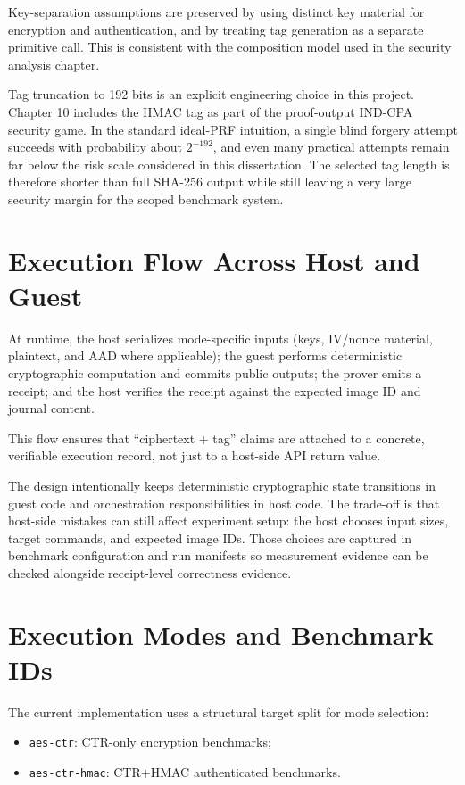 Key-separation assumptions are preserved by using distinct key material for
encryption and authentication, and by treating tag generation as a separate
primitive call. This is consistent with the composition model used in the
security analysis chapter.

Tag truncation to 192 bits is an explicit engineering choice in this project.
Chapter 10 includes the HMAC tag as part of the proof-output IND-CPA security
game.
In the standard ideal-PRF intuition, a single blind forgery attempt succeeds with
probability about \(2^{-192}\), and even many practical attempts remain far below
the risk scale considered in this dissertation. The selected tag length is
therefore shorter than full SHA-256 output while still leaving a very large
security margin for the scoped benchmark system.

\section{Execution Flow Across Host and Guest}

At runtime, the host serializes mode-specific inputs (keys, IV/nonce material,
plaintext, and AAD where applicable); the guest performs deterministic
cryptographic computation and commits
public outputs; the prover emits a receipt; and the host verifies the receipt
against the expected image ID and journal content.

This flow ensures that ``ciphertext + tag'' claims are attached to a concrete,
verifiable execution record, not just to a host-side API return value.

The design intentionally keeps deterministic cryptographic state transitions in
guest code and orchestration responsibilities in host code. The trade-off is that
host-side mistakes can still affect experiment setup: the host chooses input
sizes, target commands, and expected image IDs. Those choices are captured in
benchmark configuration and run manifests so measurement evidence can be checked
alongside receipt-level correctness evidence.

\section{Execution Modes and Benchmark IDs}

The current implementation uses a structural target split for mode selection:

\begin{itemize}
\item \texttt{aes-ctr}: CTR-only encryption benchmarks;
\item \texttt{aes-ctr-hmac}: CTR+HMAC authenticated benchmarks.
\end{itemize}

